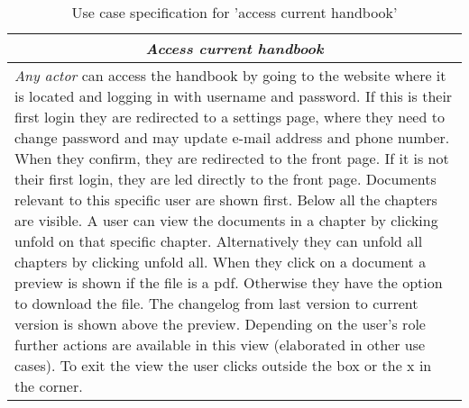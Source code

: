 \begin{table}
\centering
\begin{tabular}{p{12cm}}
\hline
\multicolumn{1}{c}{\textit{\textbf{Access current handbook}}} \\
\hline
\textit{Any actor} can access the handbook by going to the website where it is located and logging in with username and password.
If this is their first login they are redirected to a settings page, where they need to change password and may update e-mail address and phone number.
When they confirm, they are redirected to the front page.
If it is not their first login, they are led directly to the front page.
Documents relevant to this specific user are shown first.
Below all the chapters are visible.
A user can view the documents in a chapter by clicking unfold on that specific chapter.
Alternatively they can unfold all chapters by clicking unfold all.
When they click on a document a preview is shown if the file is a pdf.
Otherwise they have the option to download the file.
The changelog from last version to current version is shown above the preview.
Depending on the user's role further actions are available in this view (elaborated in other use cases).
To exit the view the user clicks outside the box or the x in the corner.
\\\hline
\end{tabular}
\caption{Use case specification for 'access current handbook'}\label{tab:access-handbook}
\end{table}
